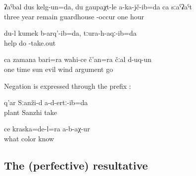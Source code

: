 \begin{exe}

	\ex	\label{ex:Three years I remained, I was not one single hour at the guardhouse}
	\gll	ʡaˁbal	dus	kelg-un=da,		du	gaupaχt-le	a-ka-jč-ib=da	ca	sːaˁʡaˁt\\
		three	year	remain			guardhouse	-occur	one	hour\\
	\glt	{}

\ex	\label{ex:I helped. I pulled him out}
	\gll	du-l	kumek	b-arq'-ib=da,	tːura-h-aqː-ib=da\\
			help	do	-take.out\\
	\glt	{}
	
	\ex	\label{ex:Once upon a time the sun and the evil wind argued analytic}
	\gll	ca	zamana	bari=ra	wahi-ce	č'an=ra	čːal	d-uq-un\\
		one	time	sun	evil	wind	argument	go\\
	\glt	{}
\end{exe}

Negation is expressed through the prefix :

\begin{exe}
	\ex	\label{ex:We did not gather plants in Sanzhi}
	\gll	q'ar	Sːanži-d	a-d-ertː-ib=da\\
		plant	Sanzhi	take\\
	\glt	{}

	\ex	\label{ex:Nobody found out what colour this is}
	\gll	ce	kraska=de-l=ra	a-b-aχ-ur\\
		what	color	know\\
	\glt	{}
\end{exe}



\subsection{The (perfective) resultative}
\label{ssec:The (perfective) resultative}

